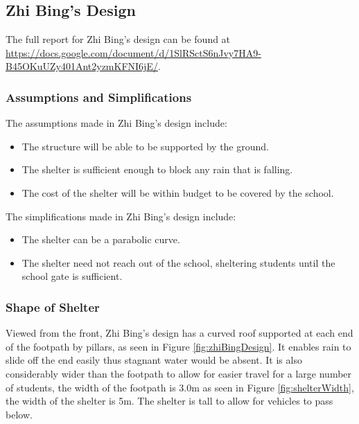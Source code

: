 \documentclass[a4paper,titlepage]{article}
\begin{document}
\subsection{Zhi Bing's Design}\label{sec:Other Feasible Models:Zhi Bing's Design}

The full report for Zhi Bing's design can be found at \url{https://docs.google.com/document/d/1SlRSctS6nJvy7HA9-B45OKuUZy401Ant2yzmKFNI6jE/}.

\subsubsection{Assumptions and Simplifications}

The assumptions made in Zhi Bing's design include:

\begin{itemize}
    \item The structure will be able to be supported by the ground.
    \item The shelter is sufficient enough to block any rain that is falling.
    \item The cost of the shelter will be within budget to be covered by the school.
\end{itemize}

The simplifications made in Zhi Bing's design include: 

\begin{itemize}
    \item The shelter can be a parabolic curve.
    \item The shelter need not reach out of the school, sheltering students until the school gate is sufficient.
\end{itemize}

\subsubsection{Shape of Shelter}

Viewed from the front, Zhi Bing's design has a curved roof supported at each end of the footpath by pillars, as seen in Figure \ref{fig:zhiBingDesign}. It enables rain to slide off the end easily thus stagnant water would be absent. It is also considerably wider than the footpath to allow for easier travel for a large number of students, the width of the footpath is 3.0m as seen in Figure \ref{fig:shelterWidth}, the width of the shelter is 5m. The shelter is tall to allow for vehicles to pass below.
\end{document}
